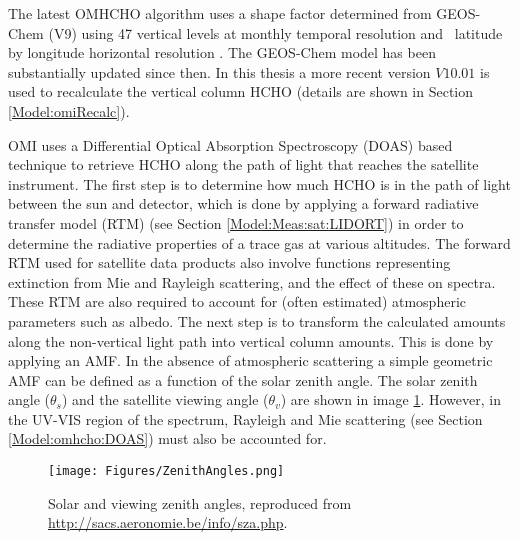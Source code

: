   The latest OMHCHO algorithm uses a shape factor determined from GEOS-Chem (V9) using 47 vertical levels at monthly temporal resolution and \lowhr ~latitude by longitude horizontal resolution \parencite{Abad2015}.
  The GEOS-Chem model has been substantially updated since then.
  In this thesis a more recent version $V10.01$ is used to recalculate the vertical column HCHO (details are shown in Section \ref{Model:omiRecalc}).
  
  OMI uses a Differential Optical Absorption Spectroscopy (DOAS) based technique to retrieve HCHO along the path of light that reaches the satellite instrument.
  The first step is to determine how much HCHO is in the path of light between the sun and detector, which is done by applying a forward radiative transfer model (RTM) (see Section \ref{Model:Meas:sat:LIDORT}) in order to determine the radiative properties of a trace gas at various altitudes.
  The forward RTM used for satellite data products also involve functions representing extinction from Mie and Rayleigh scattering, and the effect of these on spectra.
  These RTM are also required to account for (often estimated) atmospheric parameters such as albedo.
  The next step is to transform the calculated amounts along the non-vertical light path into vertical column amounts.
  This is done by applying an AMF.
  In the absence of atmospheric scattering a simple geometric AMF can be defined as a function of the solar zenith angle. 
  The solar zenith angle ($\theta_s$) and the satellite viewing angle ($\theta_v$) are shown in image \ref{ch_HCHO:fig:zenithangle}.
  However, in the UV-VIS region of the spectrum, Rayleigh and Mie scattering (see Section \ref{Model:omhcho:DOAS}) must also be accounted for.
  
  
  \begin{figure}\begin{center}
      \texttt{[image: Figures/ZenithAngles.png]}
      \caption{Solar and viewing zenith angles, reproduced from \url{http://sacs.aeronomie.be/info/sza.php}. %
        }
      \label{ch_HCHO:fig:zenithangle}
    \end{center}\end{figure}
  
